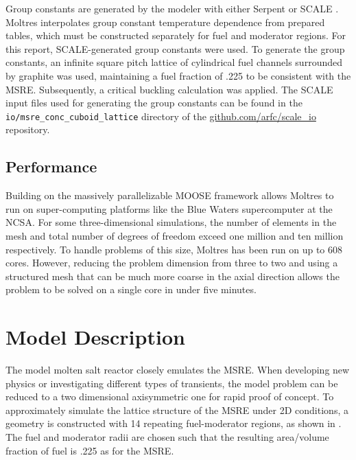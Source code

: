 \documentclass{article}
\let\Oldsection\section
\renewcommand{\section}{\FloatBarrier\Oldsection}
\let\Oldsubsection\subsection
\renewcommand{\subsection}{\FloatBarrier\Oldsubsection}
\newcommand{\code}[1]{\texttt{#1}}
\begin{document}
Group constants are generated by the modeler with either Serpent
\cite{leppanen_serpent_2015} or SCALE \cite{dehart_reactor_2011}. Moltres 
interpolates group constant temperature dependence from prepared tables, which must be
constructed separately for fuel and moderator regions. For this report,
SCALE-generated group constants were used. To generate the group constants, an
infinite square pitch lattice of cylindrical fuel channels surrounded by
graphite was used, maintaining a fuel fraction of .225 to be consistent with the
\gls{MSRE}. Subsequently, a critical buckling calculation was applied. The SCALE
input files used for generating the group constants can be found in the
\code{io/msre\_conc\_cuboid\_lattice} directory of the
\url{github.com/arfc/scale_io} repository.

\subsection{Performance}

Building on the massively parallelizable \gls{MOOSE} framework allows Moltres
to run on super-computing platforms like the Blue Waters supercomputer at the 
\gls{NCSA}. For some
three-dimensional simulations, the number of
elements in the mesh and total number of degrees of freedom exceed one million
and ten million respectively. To handle problems of this size, Moltres has been
run on up to 608 cores. However, reducing the problem dimension from three to
two and using a structured mesh that can be much more coarse in the axial
direction allows the problem to be solved on a single core in under
five minutes.

\section{Model Description}

The model molten salt reactor closely emulates the \gls{MSRE}. When developing new physics or investigating
different types of transients, the model problem can be reduced to a two
dimensional axisymmetric one for rapid proof of concept. To approximately simulate the lattice
structure of the \gls{MSRE} under 2D conditions, a geometry is constructed with 14 repeating
fuel-moderator regions, as shown in . The fuel and moderator
radii are chosen such that the resulting area/volume fraction of fuel is .225 as
for the \gls{MSRE}.
\end{document}
